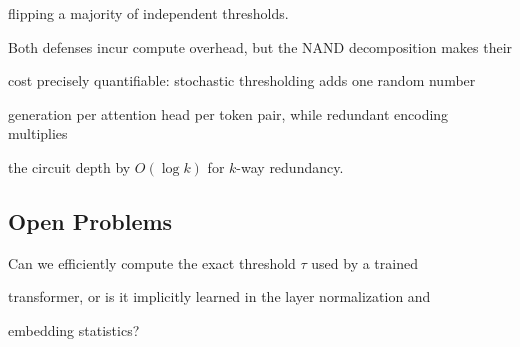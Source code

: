 flipping a majority of independent thresholds.













Both defenses incur compute overhead, but the NAND decomposition makes their






cost precisely quantifiable: stochastic thresholding adds one random number






generation per attention head per token pair, while redundant encoding multiplies






the circuit depth by $O(\log k)$ for $k$-way redundancy.













\subsection{Open Problems}













\begin{openproblem}






Can we efficiently compute the exact threshold $\tau$ used by a trained






transformer, or is it implicitly learned in the layer normalization and






embedding statistics?






\end{openproblem}













